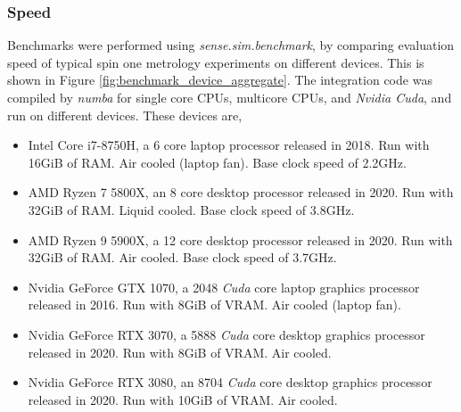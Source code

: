 \documentclass{jors}
\begin{document}
		\subsubsection*{Speed}
			Benchmarks were performed using \emph{sense.sim.benchmark}, by comparing evaluation speed of typical spin one metrology experiments on different devices. This is shown in Figure \ref{fig:benchmark_device_aggregate}. The integration code was compiled by \emph{numba} for single core CPUs, multicore CPUs, and \emph{Nvidia Cuda}, and run on different devices. These devices are,
			\begin{itemize}
				\item {} 
				Intel Core i7-8750H, a 6 core laptop processor released in 2018. Run with 16GiB of RAM. Air cooled (laptop fan). Base clock speed of 2.2GHz.

				\item {} 
				AMD Ryzen 7 5800X, an 8 core desktop processor released in 2020. Run with 32GiB of RAM. Liquid cooled. Base clock speed of 3.8GHz.

				\item {} 
				AMD Ryzen 9 5900X, a 12 core desktop processor released in 2020. Run with 32GiB of RAM. Air cooled. Base clock speed of 3.7GHz.

				\item {} 
				Nvidia GeForce GTX 1070, a 2048 \emph{Cuda} core laptop graphics processor released in 2016. Run with 8GiB of VRAM. Air cooled (laptop fan).

				\item {} 
				Nvidia GeForce RTX 3070, a 5888 \emph{Cuda} core desktop graphics processor released in 2020. Run with 8GiB of VRAM. Air cooled.

				\item {} 
				Nvidia GeForce RTX 3080, an 8704 \emph{Cuda} core desktop graphics processor released in 2020. Run with 10GiB of VRAM. Air cooled.
			\end{itemize}
\end{document}
